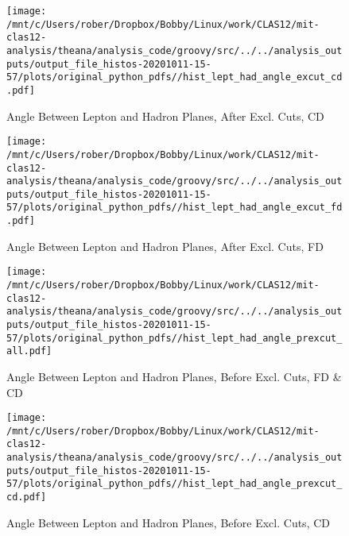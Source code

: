 \documentclass{article}
\begin{document}
\begin{landscape}
    \begin{figure}[h]
        \centering

        \texttt{[image: /mnt/c/Users/rober/Dropbox/Bobby/Linux/work/CLAS12/mit-clas12-analysis/theana/analysis\_code/groovy/src/../../analysis\_outputs/output\_file\_histos-20201011-15-57/plots/original\_python\_pdfs//hist\_lept\_had\_angle\_excut\_cd.pdf]}
        \captionsetup{textformat=empty,labelformat=blank}
        \caption{Angle Between Lepton and Hadron Planes, After Excl. Cuts, CD}
    \end{figure}
    \clearpage
    
    \begin{figure}[h]
        \centering

        \texttt{[image: /mnt/c/Users/rober/Dropbox/Bobby/Linux/work/CLAS12/mit-clas12-analysis/theana/analysis\_code/groovy/src/../../analysis\_outputs/output\_file\_histos-20201011-15-57/plots/original\_python\_pdfs//hist\_lept\_had\_angle\_excut\_fd.pdf]}
        \captionsetup{textformat=empty,labelformat=blank}
        \caption{Angle Between Lepton and Hadron Planes, After Excl. Cuts, FD}
    \end{figure}
    \clearpage
    
    \begin{figure}[h]
        \centering

        \texttt{[image: /mnt/c/Users/rober/Dropbox/Bobby/Linux/work/CLAS12/mit-clas12-analysis/theana/analysis\_code/groovy/src/../../analysis\_outputs/output\_file\_histos-20201011-15-57/plots/original\_python\_pdfs//hist\_lept\_had\_angle\_prexcut\_all.pdf]}
        \captionsetup{textformat=empty,labelformat=blank}
        \caption{Angle Between Lepton and Hadron Planes, Before Excl. Cuts, FD \& CD}
    \end{figure}
    \clearpage
    
    \begin{figure}[h]
        \centering

        \texttt{[image: /mnt/c/Users/rober/Dropbox/Bobby/Linux/work/CLAS12/mit-clas12-analysis/theana/analysis\_code/groovy/src/../../analysis\_outputs/output\_file\_histos-20201011-15-57/plots/original\_python\_pdfs//hist\_lept\_had\_angle\_prexcut\_cd.pdf]}
        \captionsetup{textformat=empty,labelformat=blank}
        \caption{Angle Between Lepton and Hadron Planes, Before Excl. Cuts, CD}
    \end{figure}
    \clearpage
    
    \begin{figure}[h]
        \centering


\end{figure}
\end{landscape}
\end{document}
